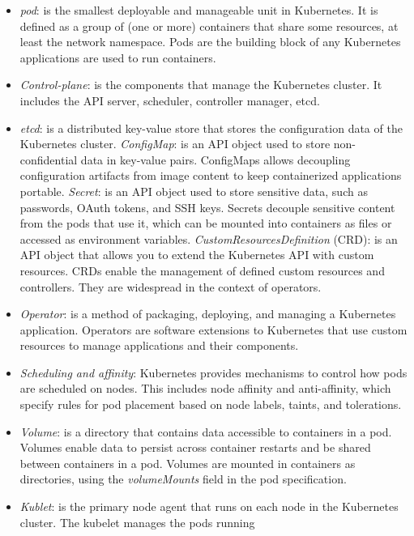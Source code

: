 \begin{itemize}
  \itemsep0em
  \item \textit{pod}: is the smallest deployable and manageable unit in
    Kubernetes. It is defined as a group of (one or more) containers that share
    some resources, at least the network namespace. Pods are the building block
    of any Kubernetes applications are used to run containers.
  \item \textit{Control-plane}: is the components that manage the Kubernetes
    cluster. It includes the API server, scheduler, controller manager, etcd.
  \item \textit{etcd}: is a distributed key-value store that stores the
    configuration data of the Kubernetes cluster.
  \textit {ConfigMap}: is an API object used to store non-confidential data in
    key-value pairs. ConfigMaps allows decoupling configuration artifacts
    from image content to keep containerized applications portable.
  \textit {Secret}: is an API object used to store sensitive data, such as
    passwords, OAuth tokens, and SSH keys. Secrets decouple sensitive content
    from the pods that use it, which can be mounted into containers as files or
    accessed as environment variables.
  \textit{CustomResourcesDefinition} (CRD): is an API object that allows you to
    extend the Kubernetes API with custom resources. CRDs enable the management
    of defined  custom resources and controllers. They are widespread in the
    context of operators.
  \item \textit{Operator}: is a method of packaging, deploying, and managing a
    Kubernetes application. Operators are software extensions to Kubernetes that
    use custom resources to manage applications and their components.
  \item \textit{Scheduling and affinity}: Kubernetes provides mechanisms to
    control how pods are scheduled on nodes. This includes node affinity and
    anti-affinity, which specify rules for pod placement based on
    node labels, taints, and tolerations.
  \item \textit{Volume}: is a directory that contains data accessible to
    containers in a pod. Volumes enable data to persist across container
    restarts and be shared between containers in a pod.
    Volumes are mounted in containers as directories, using the
    \textit{volumeMounts} field in the pod specification.
  \item \textit{Kublet}: is the primary node agent that runs on each node in the
    Kubernetes cluster. The kubelet manages the pods running

\end{itemize}

